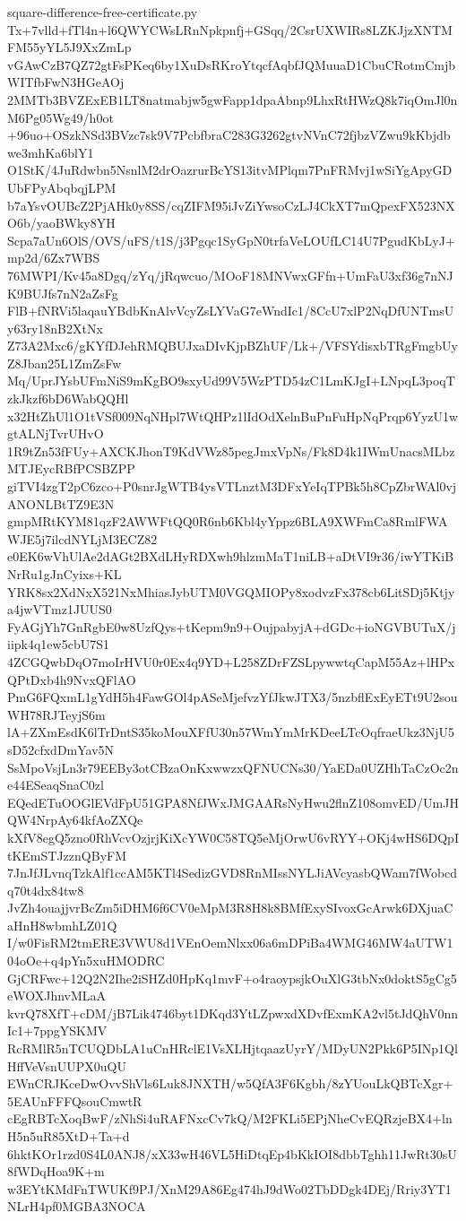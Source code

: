 \documentclass[11pt]{article}
\theoremstyle{definition}
\theoremstyle{remark}
\begin{document}
\begin{filecontents*}[overwrite]{square-difference-free-certificate.py}
Tx+7vlld+fTl4n+l6QWYCWsLRnNpkpnfj+GSqq/2CsrUXWIRs8LZKJjzXNTMFM55yYL5J9XxZmLp
vGAwCzB7QZ72gtFsPKeq6by1XuDsRKroYtqcfAqbfJQMuuaD1CbuCRotmCmjbWITfbFwN3HGeAOj
2MMTb3BVZExEB1LT8natmabjw5gwFapp1dpaAbnp9LhxRtHWzQ8k7iqOmJl0nM6Pg05Wg49/h0ot
+96uo+OSzkNSd3BVzc7sk9V7PcbfbraC283G3262gtvNVnC72fjbzVZwu9kKbjdbwe3mhKa6blY1
O1StK/4JuRdwbn5NsnlM2drOazrurBcYS13itvMPlqm7PnFRMvj1wSiYgApyGDUbFPyAbqbqjLPM
b7aYsvOUBcZ2PjAHk0y8SS/cqZIFM95iJvZiYwsoCzLJ4CkXT7mQpexFX523NXO6b/yaoBWky8YH
Scpa7aUn6OlS/OVS/uFS/t1S/j3Pgqc1SyGpN0trfaVeLOUfLC14U7PgudKbLyJ+mp2d/6Zx7WBS
76MWPI/Kv45a8Dgq/zYq/jRqwcuo/MOoF18MNVwxGFfn+UmFaU3xf36g7nNJK9BUJfs7nN2aZsFg
FlB+fNRVi5laqauYBdbKnAlvVcyZsLYVaG7eWndIc1/8CcU7xlP2NqDfUNTmsUy63ry18nB2XtNx
Z73A2Mxc6/gKYfDJehRMQBUJxaDIvKjpBZhUF/Lk+/VFSYdisxbTRgFmgbUyZ8Jban25L1ZmZsFw
Mq/UprJYsbUFmNiS9mKgBO9sxyUd99V5WzPTD54zC1LmKJgI+LNpqL3poqTzkJkzf6bD6WabQQHl
x32HtZhUl1O1tVSf009NqNHpl7WtQHPz1lIdOdXelnBuPnFuHpNqPrqp6YyzU1wgtALNjTvrUHvO
1R9tZn53fFUy+AXCKJhonT9KdVWz85pegJmxVpNs/Fk8D4k1IWmUnacsMLbzMTJEycRBfPCSBZPP
giTVI4zgT2pC6zco+P0snrJgWTB4ysVTLnztM3DFxYeIqTPBk5h8CpZbrWAl0vjANONLBtTZ9E3N
gmpMRtKYM81qzF2AWWFtQQ0R6nb6Kbl4yYppz6BLA9XWFmCa8RmlFWAWJE5j7ilcdNYLjM3ECZ82
e0EK6wVhUlAe2dAGt2BXdLHyRDXwh9hlzmMaT1niLB+aDtVI9r36/iwYTKiBNrRu1gJnCyixs+KL
YRK8sx2XdNxX521NxMhiasJybUTM0VGQMIOPy8xodvzFx378cb6LitSDj5Ktjya4jwVTmz1JUUS0
FyAGjYh7GnRgbE0w8UzfQys+tKepm9n9+OujpabyjA+dGDc+ioNGVBUTuX/jiipk4q1ew5cbU7S1
4ZCGQwbDqO7moIrHVU0r0Ex4q9YD+L258ZDrFZSLpywwtqCapM55Az+lHPxQPtDxb4h9NvxQFlAO
PmG6FQxmL1gYdH5h4FawGOl4pASeMjefvzYfJkwJTX3/5nzbflExEyETt9U2souWH78RJTeyjS6m
lA+ZXmEsdK6lTrDntS35koMouXFfU30n57WmYmMrKDeeLTcOqfraeUkz3NjU5sD52cfxdDmYav5N
SsMpoVsjLn3r79EEBy3otCBzaOnKxwwzxQFNUCNs30/YaEDa0UZHhTaCzOc2ne44ESeaqSnaC0zl
EQedETuOOGlEVdFpU51GPA8NfJWxJMGAARsNyHwu2flnZ108omvED/UmJHQW4NrpAy64kfAoZXQe
kXfV8egQ5zno0RhVcvOzjrjKiXcYW0C58TQ5eMjOrwU6vRYY+OKj4wHS6DQpItKEmSTJzznQByFM
7JnJfJLvnqTzkAlf1ccAM5KTl4SedizGVD8RnMIssNYLJiAVcyasbQWam7fWobcdq70t4dx84tw8
JvZh4ouajjvrBcZm5iDHM6f6CV0eMpM3R8H8k8BMfExySIvoxGcArwk6DXjuaCaHnH8wbmhLZ01Q
I/w0FisRM2tmERE3VWU8d1VEnOemNlxx06a6mDPiBa4WMG46MW4aUTW104oOe+q4pYn5xuHMODRC
GjCRFwc+12Q2N2Ihe2iSHZd0HpKq1mvF+o4raoypsjkOuXlG3tbNx0doktS5gCg5eWOXJhnvMLaA
kvrQ78XfT+cDM/jB7Lik4746byt1DKqd3YtLZpwxdXDvfExmKA2vl5tJdQhV0nnIc1+7ppgYSKMV
RcRMlR5nTCUQDbLA1uCnHRclE1VsXLHjtqaazUyrY/MDyUN2Pkk6P5INp1QlHffVeVsnUUPX0uQU
EWnCRJKceDwOvvShVls6Luk8JNXTH/w5QfA3F6Kgbh/8zYUouLkQBTcXgr+5EAUnFFFQsouCmwtR
cEgRBTcXoqBwF/zNhSi4uRAFNxcCv7kQ/M2FKLi5EPjNheCvEQRzjeBX4+lnH5n5uR85XtD+Ta+d
6hktKOr1rzd0S4L0ANJ8/xX33wH46VL5HiDtqEp4bKkIOI8dbbTghh11JwRt30sU8fWDqHoa9K+m
w3EYtKMdFnTWUKf9PJ/XnM29A86Eg474hJ9dWo02TbDDgk4DEj/Rriy3YT1NLrH4pf0MGBA3NOCA

\end{filecontents*}
\end{document}
